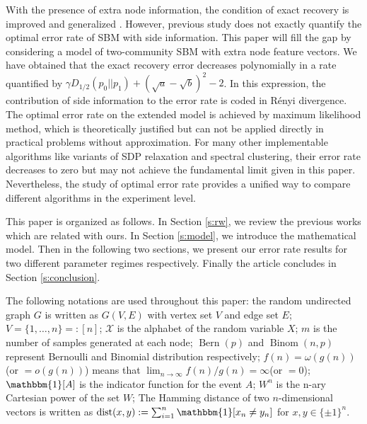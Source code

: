 \documentclass[conference,letterpaper]{IEEEtran}
\DeclareMathOperator{\dist}{dist}
\DeclareMathOperator{\Bern}{Bern}
\DeclareMathOperator{\Binom}{Binom}
\begin{document}
With the presence of extra node information, the condition of exact recovery is improved
and generalized \cite{saad2018community}. However, previous study does not exactly quantify the optimal error rate of SBM with side information. This paper will fill the gap by considering a model of two-community SBM with extra node feature vectors. We have obtained that
the exact recovery error decreases polynomially in a rate quantified by $\gamma D_{1/2}(p_0 || p_1) + (\sqrt{a} - \sqrt{b})^2 -2$. In this expression,
the contribution of side information to the error rate is coded in Rényi divergence.
The optimal error rate on the extended model is achieved by maximum likelihood method, which is theoretically justified but can not be applied directly in practical problems without approximation. For many other implementable algorithms like variants of SDP relaxation and
spectral clustering, their error rate decreases to zero but may not achieve the fundamental limit given in this paper. Nevertheless, the study of optimal error rate provides a unified way to compare
different algorithms in the experiment level.



This paper is organized as follows. In Section \ref{s:rw}, we review the previous works which are related with ours.
In Section \ref{s:model}, we introduce the mathematical model. Then in the following two sections,
we present our error rate results for two different parameter regimes respectively.
Finally the article concludes in Section \ref{s:conclusion}.

The following notations are used throughout this paper: 
the random undirected graph $G$ is written as $G(V,E)$ with vertex set $V$ and edge set $E$;
$V=\{1,\dots, n\} =: [n]$;
$\mathcal{X}$ is the alphabet
of the random variable $X$; $m$ is the number of samples generated at each node;
$\Bern(p)$ and $\Binom(n,p)$ represent Bernoulli
and Binomial distribution respectively; $f(n)=\omega(g(n))$(or $=o(g(n))$) means that $\lim_{n\to \infty} f(n) / g(n) = \infty $(or $=0$);
$\mathbbm{1}[A]$ is the indicator function for the event $A$; $W^n$ is the n-ary Cartesian power of the set $W$;
The Hamming distance of 
two $n$-dimensional vectors is written as $\dist(x,y):=\sum_{i=1}^n \mathbbm{1}[x_n\neq y_n]$ for $x,y\in \{\pm 1 \}^n$.
\end{document}
